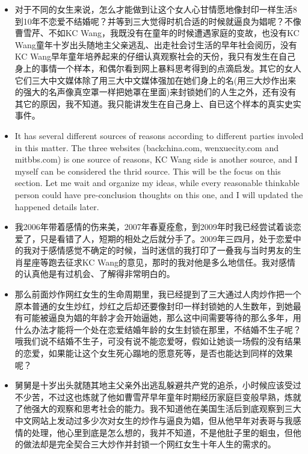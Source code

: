\documentclass[9pt, b5paper]{article}
\begin{document}
\begin{itemize}
\item 对于不同的女生来说，怎么才能做到让这个女人心甘情愿地像封印一样生活8到10年不恋爱不结婚呢？并等到三大觉得时机合适的时候就逼良为娼呢？不像曹雪芹、不如KC Wang，我既没有在童年的时候遭遇家庭的变故，也没有KC Wang童年十岁出头随地主父亲逃乱、出走社会讨生活的早年社会阅历，没有KC Wang早年童年培养起来的仔细认真观察社会的天份，我只有发生在自己身上的事情一个样本，和偶尔看到网上暴料思考得到的点滴启发。其它的女人它们三大中文媒体除了用三大中文媒体强加在她们身上的名(用三大炒作出来的强大的名声像真空罩一样把她罩在里面)来封锁她们的人生之外，还有没有其它的原因，我不知道。我只能讲发生在自己身上、自已这个样本的真实史实事件。
\item It has several different sources of reasons according to different parties involed in this matter. The three websites (backchina.com, wenxuecity.com and mitbbs.com) is one source of reasons, KC Wang side is another source, and I myself can be considered the thrid source. This will be the focus on this section. Let me wait and organize my ideas, while every reasonable thinkable person could have pre-conclusion thoughts on this one, and I will updated the happened details later.
\item 我2006年带着感情的伤来美，2007年春夏痊愈，到2009年时我已经尝试着谈恋爱了，只是看错了人，短期的相处之后就分手了。2009年三四月，处于恋爱中的我对于感情感觉不确定的时候，当时迷信的我打印了一叠我与当时男友的生肖星座等跑去征求KC Wang的意见，那时的我对他是多么地信任。我对感情的认真他是有过机会、了解得非常明白的。
\item 那么前面炒作网红女生的生命周期里，我已经提到了三大通过人肉炒作把一个原本普通的女生炒红，炒红之后却还要像封印一样封锁她的人生数年，到她最有可能被逼良为娼的年龄才会开始逼她，那么这中间需要等待的那么多年，用什么办法才能将一个处在恋爱结婚年龄的女生封锁在那里，不结婚不生子呢？哦我们说不结婚不生子，可没有说不能恋爱呀，假如让她谈一场假的没有结果的恋爱，如果能让这个女生死心蹋地的愿意死等，是否也能达到同样的效果呢？
\item 舅舅是十岁出头就随其地主父亲外出逃乱躲避共产党的追杀，小时候应该受过不少苦，不过这也炼就了他如曹雪芹早年童年时期经历家庭巨变般早熟，炼就了他强大的观察和思考社会的能力。我不知道他在美国生活后到底观察到三大中文网站上发动过多少次对女生的炒作与逼良为娼，但从他早年对表哥与我感情的处理，他心里到底是怎么想的，我并不知道，不是他肚子里的蛔虫，但他的做法却是完全契合三大炒作并封锁一个网红女生十年人生的需求的。
\end{itemize}
\end{document}
